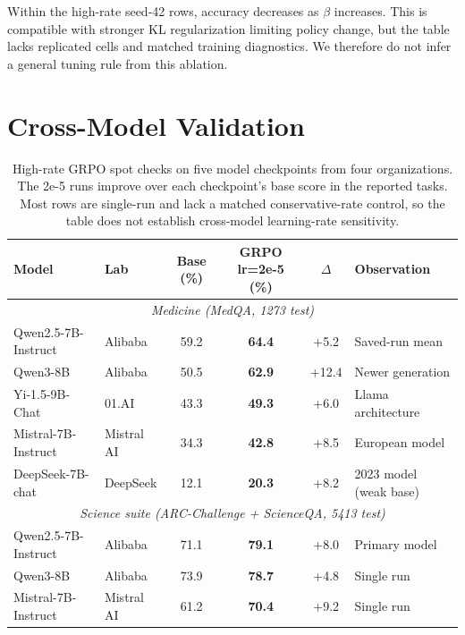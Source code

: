 \documentclass[11pt]{article}
\begin{document}
Within the high-rate seed-42 rows, accuracy decreases as $\beta$ increases. This is compatible with stronger KL regularization limiting policy change, but the table lacks replicated cells and matched training diagnostics. We therefore do not infer a general tuning rule from this ablation.

\section{Cross-Model Validation}
\label{sec:cross_model_appendix}

\begin{table}[h]
\centering
\small
\begin{tabular}{@{}llcccl@{}}
\toprule
\textbf{Model} & \textbf{Lab} & \textbf{Base (\%)} & \textbf{GRPO lr=2e-5 (\%)} & \textbf{$\Delta$} & \textbf{Observation} \\
\midrule
\multicolumn{6}{c}{\textit{Medicine (MedQA, 1273 test)}} \\
\midrule
Qwen2.5-7B-Instruct & Alibaba & 59.2 & \textbf{64.4} & +5.2 & Saved-run mean \\
Qwen3-8B & Alibaba & 50.5 & \textbf{62.9} & +12.4 & Newer generation \\
Yi-1.5-9B-Chat & 01.AI & 43.3 & \textbf{49.3} & +6.0 & Llama architecture \\
Mistral-7B-Instruct & Mistral AI & 34.3 & \textbf{42.8} & +8.5 & European model \\
DeepSeek-7B-chat & DeepSeek & 12.1 & \textbf{20.3} & +8.2 & 2023 model (weak base) \\
\midrule
\multicolumn{6}{c}{\textit{Science suite (ARC-Challenge + ScienceQA, 5413 test)}} \\
\midrule
Qwen2.5-7B-Instruct & Alibaba & 71.1 & \textbf{79.1} & +8.0 & Primary model \\
Qwen3-8B & Alibaba & 73.9 & \textbf{78.7} & +4.8 & Single run \\
Mistral-7B-Instruct & Mistral AI & 61.2 & \textbf{70.4} & +9.2 & Single run \\
\bottomrule
\end{tabular}
\caption{High-rate GRPO spot checks on five model checkpoints from four organizations. The 2e-5 runs improve over each checkpoint's base score in the reported tasks. Most rows are single-run and lack a matched conservative-rate control, so the table does not establish cross-model learning-rate sensitivity.}
\label{tab:cross_model_appendix}
\end{table}
\end{document}
